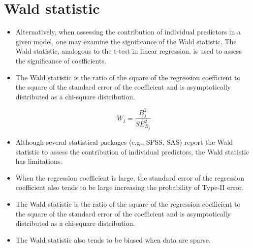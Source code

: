 \documentclass[a4paper,12pt]{article}
\begin{document}
	\section{Wald statistic}
	\begin{itemize}
		\item Alternatively, when assessing the contribution of individual predictors in a given model, one may examine the significance of the Wald statistic. The Wald statistic, analogous to the t-test in linear regression, is used to assess the significance of coefficients. 
		

				\item The Wald statistic is the ratio of the square of the regression coefficient to the square of the standard error of the coefficient and is asymptotically distributed as a chi-square distribution.
		
		\[W_j = \frac{B^2_j} {SE^2_{B_j}}\]
		
		\item Although several statistical packages (e.g., SPSS, SAS) report the Wald statistic to assess the contribution of individual predictors, the Wald statistic has limitations. 
		\item When the regression coefficient is large, the standard error of the regression coefficient also tends to be large increasing the probability of Type-II error. 
				
		\item The Wald statistic is the ratio of the square of the regression coefficient to the square of the standard error of the coefficient and is asymptotically distributed as a chi-square distribution.
		
		\item The Wald statistic also tends to be biased when data are sparse.
	\end{itemize}




\end{document}
